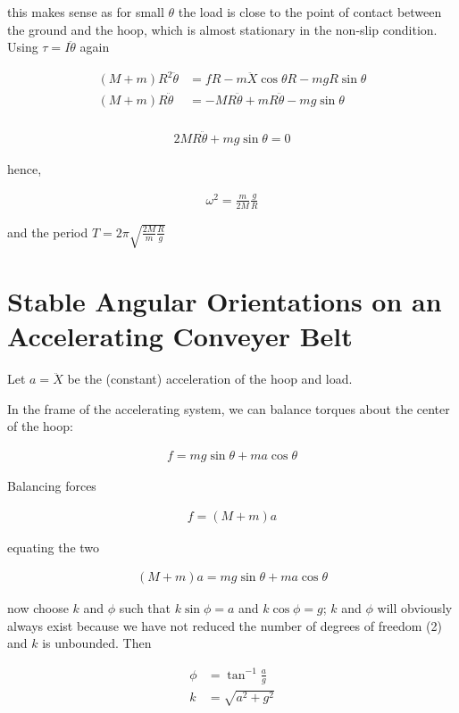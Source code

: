 \documentclass{article}
\begin{document}
this makes sense as for small $\theta$ the load is close to the point of contact between the ground and the hoop, which is almost stationary in the non-slip condition. Using $\tau = I\ddot\theta$ again

\begin{align*}
(M+m)R^2\ddot\theta &= fR - m\ddot{X}\cos\theta R - mgR\sin\theta \\
(M+m)R\ddot\theta &= -MR\ddot\theta + mR\ddot\theta - mg\sin\theta \\
\end{align*}

\begin{align*}
2MR\ddot\theta + mg\sin\theta = 0
\end{align*}

hence,

\begin{align*}
\omega^2 = \frac{m}{2M}\frac{g}{R}
\end{align*}

and the period $T = 2\pi\sqrt{\frac{2M}{m}\frac{R}{g}}$

\section{Stable Angular Orientations on an Accelerating Conveyer Belt}

Let $a = \ddot{X}$ be the (constant) acceleration of the hoop and load.

In the frame of the accelerating system, we can balance torques about the center of the hoop:

\begin{align*}
f = mg\sin\theta + ma\cos\theta
\end{align*}

Balancing forces

\begin{align*}
f = (M+m)a
\end{align*}

equating the two

\begin{align*}
(M+m)a = mg\sin\theta + ma\cos\theta
\end{align*}

now choose $k$ and $\phi$ such that $k\sin\phi = a$ and $k\cos\phi = g$; $k$ and $\phi$ will obviously always exist because we have not reduced the number of degrees of freedom (2) and $k$ is unbounded. Then

\begin{align*}
\phi &= \tan^{-1}{\frac{a}{g}} \\
k &= \sqrt{a^2 + g^2}
\end{align*}
\end{document}

